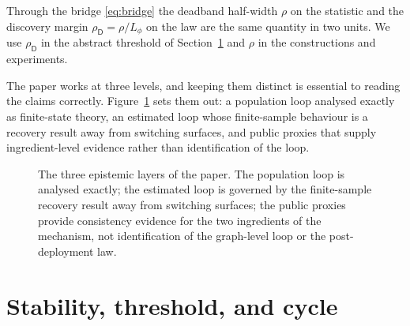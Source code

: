 \documentclass[11pt]{article}
\theoremstyle{plain}
\theoremstyle{definition}
\newcommand{\Dop}{\mathsf{D}}
\newcommand{\Dhat}{\widehat{\mathsf{D}}}
\newcommand{\Pidep}{\Pi_\beta}
\newcommand{\Sbeta}{\mathsf{S}_\beta}
\begin{document}
Through the bridge \eqref{eq:bridge} the deadband half-width $\rho$ on the statistic and the discovery margin $\rho_\Dop=\rho/L_\phi$ on the law are the same quantity in two units. We use $\rho_\Dop$ in the abstract threshold of Section~\ref{sec:theory} and $\rho$ in the constructions and experiments.

The paper works at three levels, and keeping them distinct is essential to reading the claims correctly. Figure~\ref{fig:taxonomy} sets them out: a population loop analysed exactly as finite-state theory, an estimated loop whose finite-sample behaviour is a recovery result away from switching surfaces, and public proxies that supply ingredient-level evidence rather than identification of the loop.

\begin{figure}[t]
\centering
{}
\caption{The three epistemic layers of the paper. The population loop is analysed exactly; the estimated loop is governed by the finite-sample recovery result away from switching surfaces; the public proxies provide consistency evidence for the two ingredients of the mechanism, not identification of the graph-level loop or the post-deployment law.}
\label{fig:taxonomy}
\end{figure}

\section{Stability, threshold, and cycle}\label{sec:theory}
\end{document}
